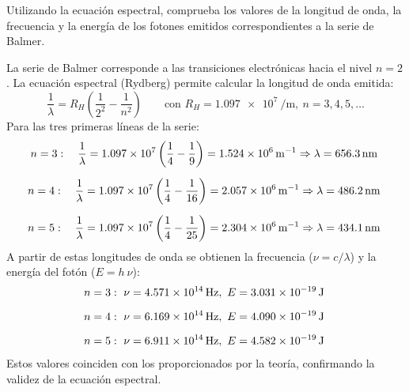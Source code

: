 \begin{exercise}
    Utilizando la ecuación espectral, comprueba los valores de la longitud de onda, la frecuencia y la energía de los fotones emitidos correspondientes a la serie de Balmer.
    \begin{solu}
        La serie de Balmer corresponde a las transiciones electrónicas hacia el nivel \(n=2\). La ecuación espectral (Rydberg) permite calcular la longitud de onda emitida:
        \begin{equation*}
            \dfrac{1}{\lambda} = R_H \left(\dfrac{1}{2^2} - \dfrac{1}{n^2}\right) \qquad \text{con } R_H = \SI{1.097e7}{\per\meter},\ n = 3, 4, 5, \ldots
        \end{equation*}
        Para las tres primeras líneas de la serie:
        \begin{gather*}
            n=3:\quad \dfrac{1}{\lambda} = \num{1.097e7}\left(\dfrac{1}{4}-\dfrac{1}{9}\right) = \SI{1.524e6}{\per\meter} \Rightarrow \lambda = \distancia[nm]{656.3}\separ
            n=4:\quad \dfrac{1}{\lambda} = \num{1.097e7}\left(\dfrac{1}{4}-\dfrac{1}{16}\right) = \SI{2.057e6}{\per\meter} \Rightarrow \lambda = \distancia[nm]{486.2}\separ
            n=5:\quad \dfrac{1}{\lambda} = \num{1.097e7}\left(\dfrac{1}{4}-\dfrac{1}{25}\right) = \SI{2.304e6}{\per\meter} \Rightarrow \lambda = \distancia[nm]{434.1}
        \end{gather*}
        A partir de estas longitudes de onda se obtienen la frecuencia (\(\nu = c/\lambda\)) y la energía del fotón (\(E = h\ \nu\)):
        \begin{gather*}
            n=3:\ \nu = \SI{4.571e14}{\hertz},\ E = \energia[j]{3.031e-19}\separ
            n=4:\ \nu = \SI{6.169e14}{\hertz},\ E = \energia[j]{4.090e-19}\separ
            n=5:\ \nu = \SI{6.911e14}{\hertz},\ E = \energia[j]{4.582e-19}
        \end{gather*}
        Estos valores coinciden con los proporcionados por la teoría, confirmando la validez de la ecuación espectral.
    \end{solu}
\end{exercise}

